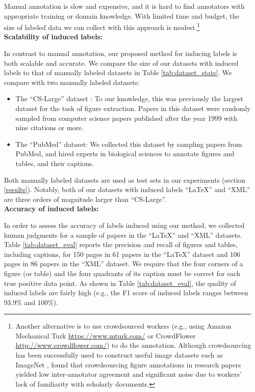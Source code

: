 \documentclass[sigconf]{acmart}
\begin{document}
Manual annotation is slow and expensive, and it is hard to find annotators with appropriate training or domain knowledge.
With limited time and budget, the size of labeled data we can collect with this approach is modest.\footnote{Another alternative is to use crowdsourced workers (e.g., using Amazon Mechanical Turk \url{https://www.mturk.com/} or CrowdFlower \url{http://www.crowdflower.com/}) to do the annotation.
Although crowdsourcing has been successfully used to construct useful image datasets such as ImageNet \cite{ImageNet}, \cite{figureseer} found that crowdsourcing figure annotations in research papers yielded low inter-annotator agreement and significant noise due to workers' lack of familiarity with scholarly documents.}
\\[15pt]\textbf{Scalability of induced labels:}

In contrast to manual annotation, our proposed method for inducing labels is both scalable and accurate.
We compare the size of our datasets with induced labels to that of manually labeled datasets in Table \ref{tab:dataset_stats}.
We compare with two manually labeled datasets:
\begin{itemize}
\item The ``CS-Large'' dataset \cite{pdffigures2}: To our knowledge, this was previously the largest dataset for the task of figure extraction. Papers in this dataset were randomly sampled from computer science papers published after the year 1999 with nine citations or more.
\item The ``PubMed'' dataset: We collected this dataset by sampling papers from PubMed, and hired experts in biological sciences to annotate figures and tables, and their captions. 
\end{itemize}
Both manually labeled datasets are used as test sets in our experiments (section \ref{results}).
Notably, both of our datasets with induced labels ``LaTeX'' and ``XML'' are three orders of magnitude larger than ``CS-Large''.
\\[15pt]\textbf{Accuracy of induced labels:}

In order to assess the accuracy of labels induced using our method, we collected human judgments for a sample of papers in the ``LaTeX'' and ``XML'' datasets.
Table \ref{tab:dataset_eval} reports the precision and recall of figures and tables, including captions, for 150 pages in 61 papers in the ``LaTeX'' dataset and 106 pages in 86 papers in the ``XML'' dataset.
We require that the four corners of a figure (or table) and the four quadrants of its caption must be correct for each true positive data point.
As shown in Table \ref{tab:dataset_eval}, the quality of induced labels are fairly high (e.g., the F1 score of induced labels ranges between 93.9\% and 100\%).
\end{document}
